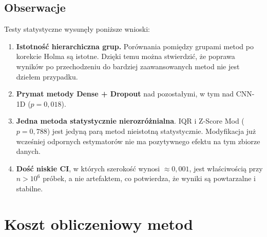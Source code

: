 \documentclass[a4paper,twoside,12pt]{book}
\begin{document}
\subsection{Obserwacje}

Testy statystyczne wysunęły poniższe wnioski:
	
\begin{enumerate}
	\item \textbf{Istotność hierarchiczna grup.} Porównania pomiędzy grupami metod po korekcie Holma są istotne. Dzięki temu można stwierdzić, że poprawa wyników po przechodzeniu do bardziej zaawansowanych metod nie jest dziełem przypadku.
	\item \textbf{Prymat metody Dense + Dropout} nad pozostałymi, w tym nad CNN-1D ($p = 0{,}018$).
	\item \textbf{Jedna metoda statystycznie nierozróżnialna}. IQR i Z-Score Mod ($p = 0{,}788$) jest jedyną parą metod nieistotną statystycznie. Modyfikacja już wcześniej odpornych estymatorów nie ma pozytywnego efektu na tym zbiorze danych.
	\item \textbf{Dość niskie CI}, w których szerokość wynosi $\approx 0{,}001$, jest właściwością przy $n > 10^6$ próbek, a nie artefaktem, co potwierdza, że wyniki są powtarzalne i stabilne.
\end{enumerate}
	
\newpage	
\section{Koszt obliczeniowy metod}
\end{document}
